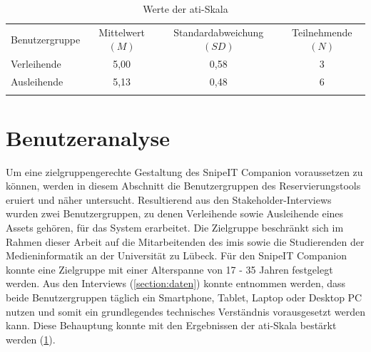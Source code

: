 \begin{table}[h]
        \centering
        \caption{Werte der \ac{ati}-Skala}
        \begin{tabular}{lccc}
                \arrayrulecolor{maincolor}\hline
                \sffamily\color{maincolor}Benutzergruppe &
                \sffamily\color{maincolor}Mittelwert $(M)$
                                                         & \sffamily\color{maincolor}Standardabweichung $(SD)$ &
                \sffamily\color{maincolor}Teilnehmende $(N)$
                \\
                \arrayrulecolor{maincolor}\hline
                Verleihende                              & 5,00
                                                         & 0,58                                                & 3
                \\
                Ausleihende                              & 5,13
                                                         & 0,48                                                & 6
                \\
                \arrayrulecolor{maincolor}\hline
        \end{tabular}
        \label{table:ati}
\end{table}

\section{Benutzeranalyse}
\label{section:benutzer}
Um eine zielgruppengerechte Gestaltung des SnipeIT Companion voraussetzen zu
können, werden in diesem Abschnitt die Benutzergruppen des Reservierungstools
eruiert und näher untersucht. Resultierend aus den Stakeholder-Interviews wurden
zwei Benutzergruppen, zu denen Verleihende sowie Ausleihende eines Assets
gehören, für das System erarbeitet. Die Zielgruppe beschränkt sich im Rahmen
dieser Arbeit auf die Mitarbeitenden des \ac{imis} sowie die Studierenden der
Medieninformatik an der Universität zu Lübeck. Für den SnipeIT Companion konnte
eine Zielgruppe mit einer Alterspanne von 17 - 35 Jahren festgelegt werden. Aus
den Interviews (\ref{section:daten}) konnte entnommen werden, dass beide
Benutzergruppen täglich ein Smartphone, Tablet, Laptop oder Desktop PC nutzen
und somit ein grundlegendes technisches Verständnis vorausgesetzt werden kann.
Diese Behauptung konnte mit den Ergebnissen der \ac{ati}-Skala bestärkt werden
(\ref{table:ati}).


